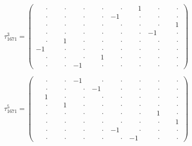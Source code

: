 \documentclass[
  10pt,
]{article}
\begin{document}
\[
\tau_{1671}^{3} = \left(\begin{array}{rrrr|rrrr}
\phantom{-}\cdot & \phantom{-}\cdot & \phantom{-}\cdot & \phantom{-}\cdot & \phantom{-}\cdot & \phantom{-}1 & \phantom{-}\cdot & \phantom{-}\cdot \\[-1.8pt]
\phantom{-}\cdot & \phantom{-}\cdot & \phantom{-}\cdot & \phantom{-}\cdot & -1 & \phantom{-}\cdot & \phantom{-}\cdot & \phantom{-}\cdot \\[-1.8pt]
\phantom{-}\cdot & \phantom{-}\cdot & \phantom{-}\cdot & \phantom{-}\cdot & \phantom{-}\cdot & \phantom{-}\cdot & \phantom{-}\cdot & \phantom{-}1 \\[-1.8pt]
\phantom{-}\cdot & \phantom{-}\cdot & \phantom{-}\cdot & \phantom{-}\cdot & \phantom{-}\cdot & \phantom{-}\cdot & -1 & \phantom{-}\cdot \\[-1.8pt]
\hline
\phantom{-}\cdot & \phantom{-}1 & \phantom{-}\cdot & \phantom{-}\cdot & \phantom{-}\cdot & \phantom{-}\cdot & \phantom{-}\cdot & \phantom{-}\cdot \\[-1.8pt]
-1 & \phantom{-}\cdot & \phantom{-}\cdot & \phantom{-}\cdot & \phantom{-}\cdot & \phantom{-}\cdot & \phantom{-}\cdot & \phantom{-}\cdot \\[-1.8pt]
\phantom{-}\cdot & \phantom{-}\cdot & \phantom{-}\cdot & \phantom{-}1 & \phantom{-}\cdot & \phantom{-}\cdot & \phantom{-}\cdot & \phantom{-}\cdot \\[-1.8pt]
\phantom{-}\cdot & \phantom{-}\cdot & -1 & \phantom{-}\cdot & \phantom{-}\cdot & \phantom{-}\cdot & \phantom{-}\cdot & \phantom{-}\cdot
\end{array}\right)
\]

\[
\tau_{1671}^{5} = \left(\begin{array}{rrrr|rrrr}
\phantom{-}\cdot & \phantom{-}\cdot & -1 & \phantom{-}\cdot & \phantom{-}\cdot & \phantom{-}\cdot & \phantom{-}\cdot & \phantom{-}\cdot \\[-1.8pt]
\phantom{-}\cdot & \phantom{-}\cdot & \phantom{-}\cdot & -1 & \phantom{-}\cdot & \phantom{-}\cdot & \phantom{-}\cdot & \phantom{-}\cdot \\[-1.8pt]
\phantom{-}1 & \phantom{-}\cdot & \phantom{-}\cdot & \phantom{-}\cdot & \phantom{-}\cdot & \phantom{-}\cdot & \phantom{-}\cdot & \phantom{-}\cdot \\[-1.8pt]
\phantom{-}\cdot & \phantom{-}1 & \phantom{-}\cdot & \phantom{-}\cdot & \phantom{-}\cdot & \phantom{-}\cdot & \phantom{-}\cdot & \phantom{-}\cdot \\[-1.8pt]
\hline
\phantom{-}\cdot & \phantom{-}\cdot & \phantom{-}\cdot & \phantom{-}\cdot & \phantom{-}\cdot & \phantom{-}\cdot & \phantom{-}1 & \phantom{-}\cdot \\[-1.8pt]
\phantom{-}\cdot & \phantom{-}\cdot & \phantom{-}\cdot & \phantom{-}\cdot & \phantom{-}\cdot & \phantom{-}\cdot & \phantom{-}\cdot & \phantom{-}1 \\[-1.8pt]
\phantom{-}\cdot & \phantom{-}\cdot & \phantom{-}\cdot & \phantom{-}\cdot & -1 & \phantom{-}\cdot & \phantom{-}\cdot & \phantom{-}\cdot \\[-1.8pt]
\phantom{-}\cdot & \phantom{-}\cdot & \phantom{-}\cdot & \phantom{-}\cdot & \phantom{-}\cdot & -1 & \phantom{-}\cdot & \phantom{-}\cdot
\end{array}\right)
\]
\end{document}
